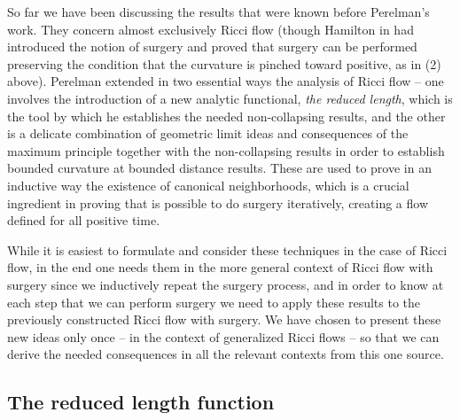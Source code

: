 So far we have been discussing the results that were known before
Perelman's work. They concern almost exclusively Ricci flow (though
Hamilton in \cite{Hamilton4MPIC} had introduced the notion of
surgery and proved that surgery can be performed preserving the
condition that the curvature is pinched toward positive, as in (2)
above). Perelman extended in two essential ways the analysis of
Ricci flow -- one involves the introduction of a new analytic
functional, {\em the reduced length}, which is the tool by which he
establishes the needed non-collapsing results, and the other is a
delicate combination of geometric limit ideas and consequences of
the maximum principle together with the non-collapsing results in
order to establish bounded curvature at bounded distance results.
These are used to prove in an inductive way the existence of
canonical neighborhoods, which is a crucial ingredient in proving
that is possible to do surgery iteratively, creating a flow defined
for all positive time.

While it is easiest to formulate and consider these techniques in
the case of Ricci flow, in the end one needs them in the more
general context of Ricci flow with surgery since we inductively
repeat the surgery process, and in order to know at each step that
we can perform surgery we need to apply these results to the
previously constructed Ricci flow with surgery. We have chosen to
present these new ideas only once -- in the context of generalized
Ricci flows -- so that we can derive the needed consequences in all
the relevant contexts from this one source.

\subsection{The reduced length function}

